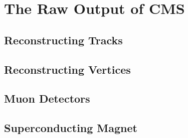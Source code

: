 \section{The Raw Output of CMS}
\label{sec:CMSout}

\subsection{Reconstructing Tracks}
\label{ssec:Tracker}
\subsection{Reconstructing Vertices}
\label{ssec:ECALHCAL}
\subsection{Muon Detectors}
\label{ssec:MuonChambers}
\subsection{Superconducting Magnet}
\label{ssec:Magnet}